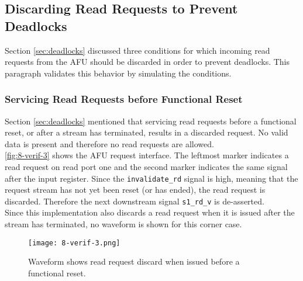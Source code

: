 \subsection{Discarding Read Requests to Prevent Deadlocks}
Section \ref{sec:deadlocks} discussed three conditions for which incoming read requests from the AFU should be discarded in order to prevent deadlocks. This paragraph validates this behavior by simulating the conditions.

\subsubsection{Servicing Read Requests before Functional Reset}
Section \ref{sec:deadlocks} mentioned that servicing read requests before a functional reset, or after a stream has terminated, results in a discarded request. No valid data is present and therefore no read requests are allowed.\\
\autoref{fig:8-verif-3} shows the AFU request interface. The leftmost marker indicates a read request on read port one and the second marker indicates the same signal after the input register. Since the \texttt{invalidate\_rd} signal is high, meaning that the request stream has not yet been reset (or has ended), the read request is discarded. Therefore the next downstream signal \texttt{s1\_rd\_v} is de-asserted.\\
Since this implementation also discards a read request when it is issued after the stream has terminated, no waveform is shown for this corner case.

\begin{figure}[H]
  \centering
  \texttt{[image: 8-verif-3.png]}
  \caption{Waveform shows read request discard when issued before a functional reset.}
  \label{fig:8-verif-3}
\end{figure}


